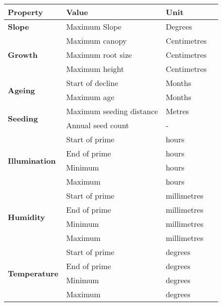 \begin{table}[]
  \centering
	    \begin{tabular}{|p{4cm}|p{7cm}|p{2cm}|p{0cm}|}
		\hline	
		\textbf{Property} & \textbf{Value} & \textbf{Unit} \\
		\hline
		\textbf{Slope} & Maximum Slope & Degrees \\
		\hline
		\multirow{3}{*}{\textbf{Growth}} & \multicolumn{1}{l|}{Maximum canopy} & \multicolumn{1}{l|}{Centimetres} \\\cline{2-3}
        						   & \multicolumn{1}{l|}{Maximum root size} & \multicolumn{1}{l|}{Centimetres} \\\cline{2-3}
                               & \multicolumn{1}{l|}{Maximum height} & \multicolumn{1}{l|}{Centimetres} \\
		\hline
		\multirow{2}{*}{\textbf{Ageing}} & \multicolumn{1}{l|}{Start of decline} & \multicolumn{1}{l|}{Months} \\\cline{2-3}
        						   & \multicolumn{1}{l|}{Maximum age} & \multicolumn{1}{l|}{Months} \\
		\hline    
		\multirow{2}{*}{\textbf{Seeding}} & \multicolumn{1}{l|}{Maximum seeding distance} & \multicolumn{1}{l|}{Metres} \\\cline{2-3}
        						   & \multicolumn{1}{l|}{Annual seed count} & \multicolumn{1}{l|}{ - } \\
		\hline    
		\multirow{4}{*}{\textbf{Illumination}}
								& \multicolumn{1}{l|}{Start of prime} & \multicolumn{1}{l|}{hours} \\\cline{2-3}
								& \multicolumn{1}{l|}{End of prime} & \multicolumn{1}{l|}{hours} \\\cline{2-3}
								& \multicolumn{1}{l|}{Minimum} & \multicolumn{1}{l|}{hours} \\\cline{2-3}
								& \multicolumn{1}{l|}{Maximum} & \multicolumn{1}{l|}{hours} \\
		\hline   
		\multirow{4}{*}{\textbf{Humidity}}
								& \multicolumn{1}{l|}{Start of prime} & \multicolumn{1}{l|}{millimetres} \\\cline{2-3}
								& \multicolumn{1}{l|}{End of prime} & \multicolumn{1}{l|}{millimetres} \\\cline{2-3}
								& \multicolumn{1}{l|}{Minimum} & \multicolumn{1}{l|}{millimetres} \\\cline{2-3}
								& \multicolumn{1}{l|}{Maximum} & \multicolumn{1}{l|}{millimetres} \\
		\hline    
		\multirow{4}{*}{\textbf{Temperature}}
								& \multicolumn{1}{l|}{Start of prime} & \multicolumn{1}{l|}{degrees} \\\cline{2-3}
								& \multicolumn{1}{l|}{End of prime} & \multicolumn{1}{l|}{degrees} \\\cline{2-3}
								& \multicolumn{1}{l|}{Minimum} & \multicolumn{1}{l|}{degrees} \\\cline{2-3}
								& \multicolumn{1}{l|}{Maximum} & \multicolumn{1}{l|}{degrees} \\
		\hline                                                                           
		\end{tabular}	
\end{table}

